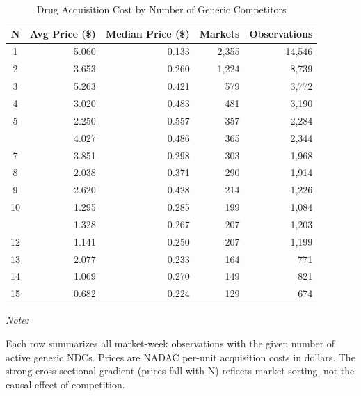 \begin{table}[!h]
\centering
\caption{\label{tab:tab:cross_section}Drug Acquisition Cost by Number of Generic Competitors}
\centering
\begin{threeparttable}
\begin{tabular}[t]{crrrr}
\toprule
N & Avg Price (\$) & Median Price (\$) & Markets & Observations\\
\midrule
1 & 5.060 & 0.133 & 2,355 & 14,546\\
2 & 3.653 & 0.260 & 1,224 & 8,739\\
3 & 5.263 & 0.421 & 579 & 3,772\\
4 & 3.020 & 0.483 & 481 & 3,190\\
5 & 2.250 & 0.557 & 357 & 2,284\\
\addlinespace
6 & 4.027 & 0.486 & 365 & 2,344\\
7 & 3.851 & 0.298 & 303 & 1,968\\
8 & 2.038 & 0.371 & 290 & 1,914\\
9 & 2.620 & 0.428 & 214 & 1,226\\
10 & 1.295 & 0.285 & 199 & 1,084\\
\addlinespace
11 & 1.328 & 0.267 & 207 & 1,203\\
12 & 1.141 & 0.250 & 207 & 1,199\\
13 & 2.077 & 0.233 & 164 & 771\\
14 & 1.069 & 0.270 & 149 & 821\\
15 & 0.682 & 0.224 & 129 & 674\\
\bottomrule
\end{tabular}
\begin{tablenotes}
\item \textit{Note: } 
\item Each row summarizes all market-week observations with the given number of active generic NDCs. Prices are NADAC per-unit acquisition costs in dollars. The strong cross-sectional gradient (prices fall with N) reflects market sorting, not the causal effect of competition.
\end{tablenotes}
\end{threeparttable}
\end{table}
